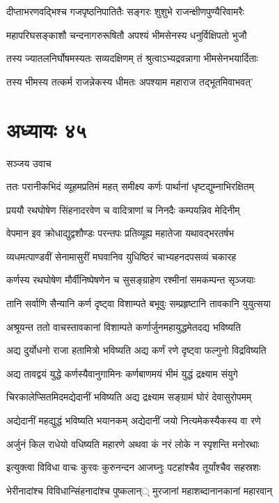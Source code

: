 \twolineshloka
{दीप्ताभरणवद्भिश्च गजपृष्ठनिपातितैः}
{सङ्गरः शुशुभे राजन्क्षीणपुण्यैरिवामरैः}


\twolineshloka
{महापरिघसङ्काशौ चन्दनागरुरूषितौ}
{अपश्यं भीमसेनस्य धनुर्विक्षिपतो भुजौ}


\twolineshloka
{तस्य ज्यातलनिर्घोषमस्यतः सव्यदक्षिणम्}
{तं श्रुत्वाऽभ्यद्रवन्नागा भीमसेनभयार्दिताः}


\twolineshloka
{तस्य भीमस्य तत्कर्म राजन्नेकस्य धीमतः}
{अपश्याम महाराज तद्भूतमिवाभवत्'}


\chapter{अध्यायः ४५}
\twolineshloka
{सञ्जय उवाच}
{}


\twolineshloka
{ततः परानीकभिदं व्यूहमप्रतिमं महत्}
{समीक्ष्य कर्णः पार्थानां धृष्टद्युम्नाभिरक्षितम्}


\twolineshloka
{प्रययौ रथघोषेण सिंहनादरवेण च}
{वादित्राणां च निनदैः कम्पयन्निव मेदिनीम्}


\twolineshloka
{वेपमान इव क्रोधाद्युद्वशौण्डः परन्तपः}
{प्रतिव्यूह्य महातेजा यथावद्भरतर्षभ}


\twolineshloka
{व्यधमत्पाण्डवीं सेनामासुरीं मघवानिव}
{युधिष्ठिरं चाभ्यहनदपसव्यं चकारह}


\twolineshloka
{कर्णस्य रथघोषेण मौर्वीनिष्पेषणेन च}
{सुसङ्ग्राहेण रश्मीनां समकम्पन्त सृञ्जयाः}


\twolineshloka
{तानि सर्वाणि सैन्यानि कर्ण दृष्ट्वा विशाम्पते}
{बभूवुः सम्प्रहृष्टानि तावकानि युयुत्सया}


\twolineshloka
{अश्रूयन्त ततो वाचस्तावकानां विशाम्पते}
{कर्णार्जुनमहायुद्धमेतदद्य भविष्यति}


\twolineshloka
{अद्य दुर्योधनो राजा हतामित्रो भविष्यति}
{अद्य कर्णं रणे दृष्ट्वा फल्गुनो विद्रविष्यति}


\twolineshloka
{अद्य तावद्वयं युद्धे कर्णस्यैवानुगामिनः}
{कर्णबाणमयं भीमं युद्धं द्रक्ष्याम संयुगे}


\twolineshloka
{चिरकालेप्सितमिदमद्येदानीं भविष्यति}
{अद्य द्रक्ष्याम सङ्ग्रामं घोरं देवासुरोपमम्}


\twolineshloka
{अद्येदानीं महद्युद्धं भविष्यति भयानकम्}
{अद्येदानीं जयो नित्यमेकस्यैकस्य वा रणे}


\twolineshloka
{अर्जुनं किल राधेयो वधिष्यति महारणे}
{अथवा कं नरं लोके न स्पृशन्ति मनोरथाः}


\twolineshloka
{इत्युक्त्वा विविधा वाचः कुरवः कुरुनन्दन}
{आजघ्नुः पटहांश्चैव तूर्यांश्चैव सहस्रशः}


\twolineshloka
{भेरीनादांश्च विविधान्सिंहनादांश्च पुष्कलान््}
{मुरजानां महाशब्दानानकानां महारवान्}


